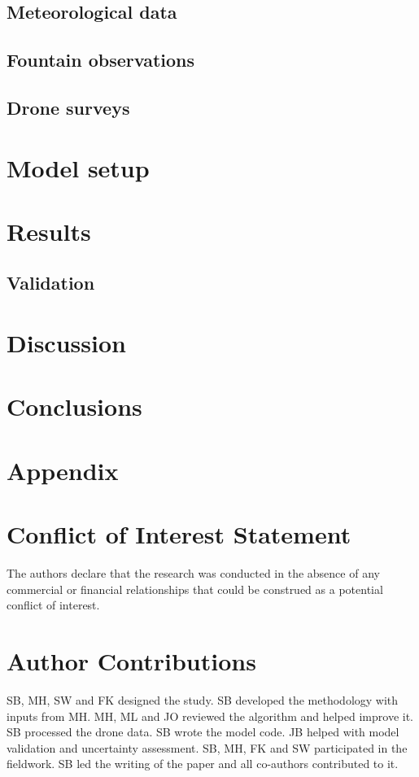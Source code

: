 \documentclass[utf8]{frontiersSCNS}
\begin{document}
\subsection{Meteorological data}

\subsection{Fountain observations}

\subsection{Drone surveys}

\section{Model setup}

\section{Results}

\subsection{Validation}

\section{Discussion}

\section{Conclusions}

\section{Appendix}

\section*{Conflict of Interest Statement} The authors declare that the research was conducted in the absence of
any commercial or financial relationships that could be construed as a potential conflict of interest.

\section*{Author Contributions} SB, MH, SW and FK designed the study.  SB developed the methodology with inputs
from MH.  MH, ML and JO reviewed the algorithm and helped improve it. SB processed the drone data. SB wrote the
model code. JB helped with model validation and uncertainty assessment. SB, MH, FK and SW participated in the
fieldwork.  SB led the writing of the paper and all co-authors contributed to it.
\end{document}
